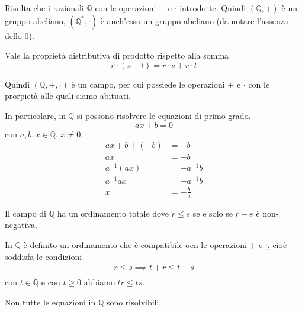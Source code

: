 \documentclass[a4paper]{article}
\begin{document}
Risulta che i razionali \(\mathbb{Q}\) con le operazioni \(+\) e \(\cdot\) introdotte.
Quindi \((\mathbb{Q}, +)\) è un gruppo abeliano, \(({\mathbb{Q}}^*, \cdot)\) è anch'esso un gruppo abeliano
(da notare l'assenza dello 0).

Vale la proprietà distributiva di prodotto rispetto alla somma
\[ r\cdot (s+t) = r\cdot s + r\cdot t \]

Quindi \((\mathbb{Q}, +, \cdot)\) è un campo, per cui possiede le operazioni \(+\) e \(\cdot\)
con le prorpietà alle quali siamo abituati.

\pagebreak

In particolare, in \(\mathbb{Q}\) si possono risolvere le equazioni di primo grado.
\[
    ax+b=0
\]
con \(a,b,x\in\mathbb{Q}\), \(x\neq 0\).
\begin{align*}
    ax+b+(-b)&=-b \\
    ax&= -b \\
    a^{-1}(ax) &= -a^{-1}b \\
    a^{-1}ax &= -a^{-1}b \\
    x &= -\frac{b}{a} 
\end{align*}

Il campo di \(\mathbb{Q}\) ha un ordinamento totale dove \(r \leq s\) se e solo se \(r - s\) è
non-negativa.

In \(\mathbb{Q}\) è definito un ordinamento che è compatibile ocn le operazioni \(+\) e \(\cdot\),
cioè soddisfa le condizioni
\begin{align*}
    r \leq s \implies t + r \leq t + s \\
\end{align*}
con \(t\in \mathbb{Q}\) e con \(t \geq 0\) abbiamo \(tr \leq ts\).


Non tutte le equazioni in \(\mathbb{Q}\) sono risolvibili.


\end{document}
